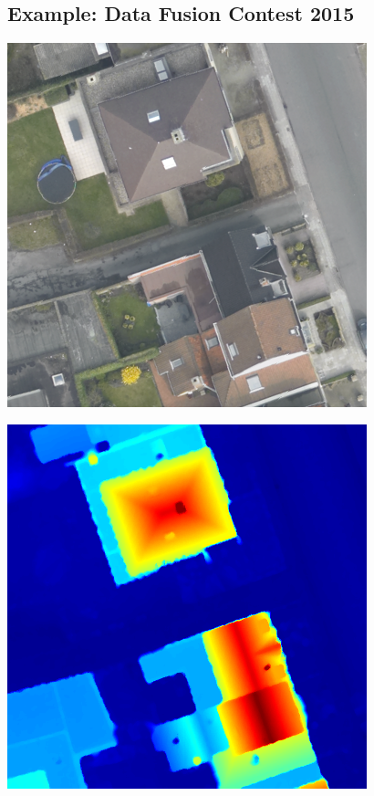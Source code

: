 \documentclass[a0,landscape]{a0poster}
\begin{document}
\begin{multicols}{4}
\subsection*{Example: Data Fusion Contest 2015 \cite{7536139}}
{ \centering
  \begin{minipage}{0.45\columnwidth}
    \centering
    \includegraphics[width=\textwidth]{./Images/DFC2015/optical.png}%
  \end{minipage}\hfill %
  \begin{minipage}{0.45\columnwidth}
    \centering
    \includegraphics[width=\textwidth]{./Images/DFC2015/lidarColor.png}
  \end{minipage}
  \label{fig:DFCfig1}
}


\end{multicols}
\end{document}
